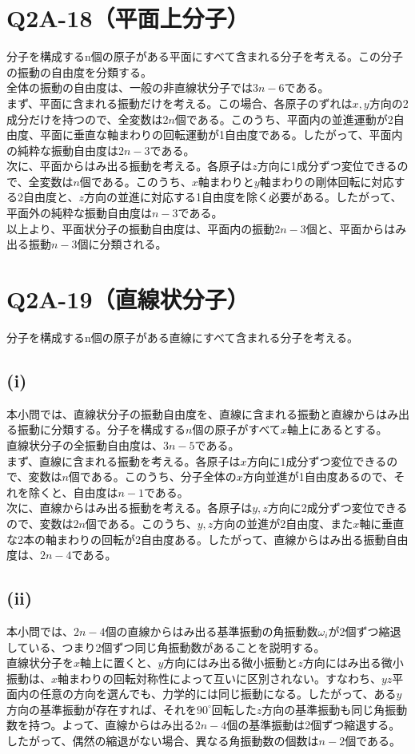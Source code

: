   \section{Q2A-18（平面上分子）}
  分子を構成するn個の原子がある平面にすべて含まれる分子を考える。この分子の振動の自由度を分類する。\\
  全体の振動の自由度は、一般の非直線状分子では$3n-6$である。\\
  まず、平面に含まれる振動だけを考える。この場合、各原子のずれは$x,y$方向の2成分だけを持つので、全変数は$2n$個である。このうち、平面内の並進運動が2自由度、平面に垂直な軸まわりの回転運動が1自由度である。したがって、平面内の純粋な振動自由度は$2n-3$である。\\
  次に、平面からはみ出る振動を考える。各原子は$z$方向に1成分ずつ変位できるので、全変数は$n$個である。このうち、$x$軸まわりと$y$軸まわりの剛体回転に対応する2自由度と、$z$方向の並進に対応する1自由度を除く必要がある。したがって、平面外の純粋な振動自由度は$n-3$である。\\
  以上より、平面状分子の振動自由度は、平面内の振動$2n-3$個と、平面からはみ出る振動$n-3$個に分類される。
  
  \section{Q2A-19（直線状分子）}
  分子を構成するn個の原子がある直線にすべて含まれる分子を考える。
  
  \subsection*{(i)}
  本小問では、直線状分子の振動自由度を、直線に含まれる振動と直線からはみ出る振動に分類する。分子を構成する$n$個の原子がすべて$x$軸上にあるとする。\\
  直線状分子の全振動自由度は、$3n-5$である。\\
  まず、直線に含まれる振動を考える。各原子は$x$方向に1成分ずつ変位できるので、変数は$n$個である。このうち、分子全体の$x$方向並進が1自由度あるので、それを除くと、自由度は$n-1$である。\\
  次に、直線からはみ出る振動を考える。各原子は$y,z$方向に2成分ずつ変位できるので、変数は$2n$個である。このうち、$y,z$方向の並進が2自由度、また$x$軸に垂直な2本の軸まわりの回転が2自由度ある。したがって、直線からはみ出る振動自由度は、$2n-4$である。
  
  \subsection*{(ii)}
  本小問では、$2n-4$個の直線からはみ出る基準振動の角振動数$\omega_i$が2個ずつ縮退している、つまり2個ずつ同じ角振動数があることを説明する。\\
  直線状分子を$x$軸上に置くと、$y$方向にはみ出る微小振動と$z$方向にはみ出る微小振動は、$x$軸まわりの回転対称性によって互いに区別されない。すなわち、$yz$平面内の任意の方向を選んでも、力学的には同じ振動になる。したがって、ある$y$方向の基準振動が存在すれば、それを$90^\circ$回転した$z$方向の基準振動も同じ角振動数を持つ。よって、直線からはみ出る$2n-4$個の基準振動は2個ずつ縮退する。したがって、偶然の縮退がない場合、異なる角振動数の個数は$n-2$個である。
  
